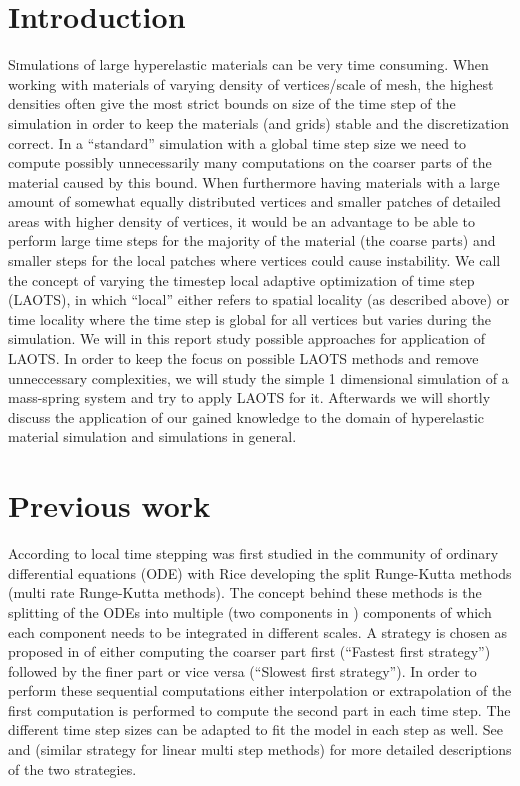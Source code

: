 \documentclass[twoside]{article}
\begin{document}
\begin{multicols}{2} %

\section{Introduction}
\lettrine[nindent=0em,lines=3]{S} imulations of large hyperelastic materials
can be very time consuming. When working with materials of varying density
of vertices/scale of mesh, the highest densities often give the most
strict bounds on size of the time step of the simulation in order to keep
the materials (and grids) stable and the discretization correct. In a
``standard'' simulation with a global time step size we need to compute
possibly unnecessarily many computations on the coarser parts of the material
caused by this bound. When furthermore having materials with a large amount
of somewhat equally distributed vertices and smaller patches of detailed
areas with higher density of vertices, it would be an advantage to be able
to perform large time steps for the majority of the material (the coarse
parts) and smaller steps for the local patches where vertices could cause
instability. We call the concept of varying the timestep local adaptive
optimization of time step (LAOTS), in which ``local'' either refers to spatial
locality (as described above) or time locality where the time step is global
for all vertices but varies during the simulation. We will in this report
study possible approaches for application of LAOTS. In order to keep the focus
on possible LAOTS methods and remove unneccessary complexities, we will study
the simple 1 dimensional simulation of a mass-spring system and try to apply
LAOTS for it. Afterwards we will shortly discuss the application of our gained
knowledge to the domain of hyperelastic material simulation and simulations in
general.


\section{Previous work} According to \cite{Gander:2013} local time stepping
was first studied in the community of ordinary differential equations (ODE)
with Rice \cite{rice:1960} developing the split Runge-Kutta methods (multi
rate Runge-Kutta methods). The concept behind these methods is the splitting
of the ODEs into multiple (two components in \cite{rice:1960}) components of
which each component needs to be integrated in different scales. A strategy
is chosen as proposed in \cite{Kvaernoe:1999} of either computing the coarser
part first (``Fastest first strategy'') followed by the finer part or vice
versa (``Slowest first strategy''). In order to perform these sequential
computations either interpolation or extrapolation of the first computation
is performed to compute the second part in each time step. The different
time step sizes can be adapted to fit the model in each step as well. See
\cite{Kvaernoe:1999} and \cite{Gear:1984} (similar strategy for linear multi
step methods) for more detailed descriptions of the two strategies.


\end{multicols}
\end{document}
